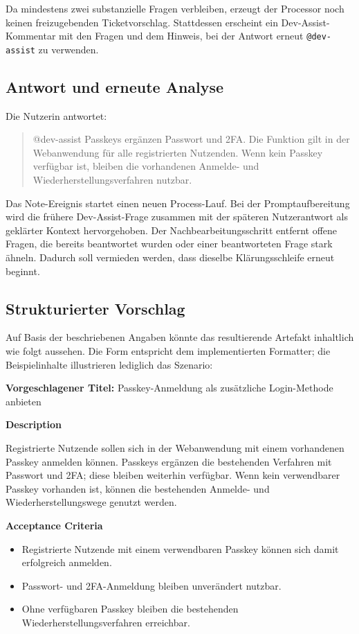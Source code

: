 Da mindestens zwei substanzielle Fragen verbleiben, erzeugt der Processor noch keinen freizugebenden Ticketvorschlag. Stattdessen erscheint ein Dev-Assist-Kommentar mit den Fragen und dem Hinweis, bei der Antwort erneut \texttt{@dev-assist} zu verwenden.

\subsection{Antwort und erneute Analyse}

Die Nutzerin antwortet:

\begin{quote}
\ttfamily\raggedright
@dev-assist Passkeys ergänzen Passwort und 2FA. Die Funktion gilt in der Webanwendung für alle registrierten Nutzenden. Wenn kein Passkey verfügbar ist, bleiben die vorhandenen Anmelde- und Wiederherstellungs\-verfahren nutzbar.
\end{quote}

Das Note-Ereignis startet einen neuen Process-Lauf. Bei der Promptaufbereitung wird die frühere Dev-Assist-Frage zusammen mit der späteren Nutzerantwort als geklärter Kontext hervorgehoben. Der Nachbearbeitungsschritt entfernt offene Fragen, die bereits beantwortet wurden oder einer beantworteten Frage stark ähneln. Dadurch soll vermieden werden, dass dieselbe Klärungsschleife erneut beginnt.

\subsection{Strukturierter Vorschlag}

Auf Basis der beschriebenen Angaben könnte das resultierende Artefakt inhaltlich wie folgt aussehen. Die Form entspricht dem implementierten Formatter; die Beispielinhalte illustrieren lediglich das Szenario:

\textbf{Vorgeschlagener Titel:} Passkey-Anmeldung als zusätzliche Login-Methode anbieten

\textbf{Description}

Registrierte Nutzende sollen sich in der Webanwendung mit einem vorhandenen Passkey anmelden können. Passkeys ergänzen die bestehenden Verfahren mit Passwort und 2FA; diese bleiben weiterhin verfügbar. Wenn kein verwendbarer Passkey vorhanden ist, können die bestehenden Anmelde- und Wiederherstellungswege genutzt werden.

\textbf{Acceptance Criteria}

\begin{itemize}[leftmargin=0.8cm]
\item Registrierte Nutzende mit einem verwendbaren Passkey können sich damit erfolgreich anmelden.
\item Passwort- und 2FA-Anmeldung bleiben unverändert nutzbar.
\item Ohne verfügbaren Passkey bleiben die bestehenden Wiederherstellungsverfahren erreichbar.
\end{itemize}

